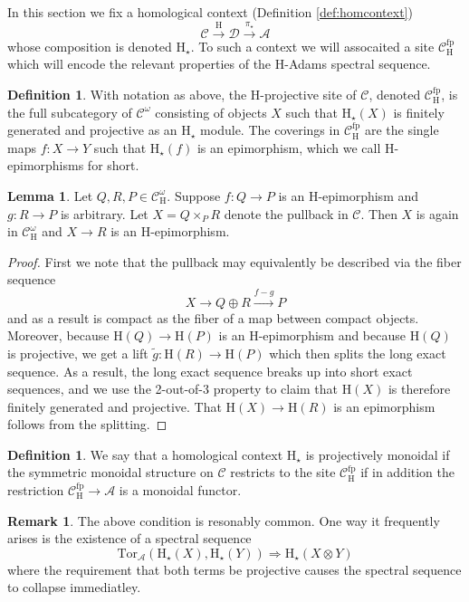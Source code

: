 \documentclass[10pt]{amsart}
\theoremstyle{definition}
\numberwithin{figure}{section}
\numberwithin{equation}{section}
\newtheorem{lemma}[figure]{Lemma}
\newtheorem{definition}[figure]{Definition}
\newtheorem{remark}[figure]{Remark}
\newcommand{\cA}{\mathcal{A}}
\newcommand{\cC}{\mathcal{C}}
\newcommand{\cD}{\mathcal{D}}
\theoremstyle{cited}
\newcommand{\fp}{\mathrm{fp}}
\renewcommand{\H}{\mathrm{H}}
\newcommand{\Tor}{\mathrm{Tor}}
\begin{document}
In this section we fix a homological context (Definition \ref{def:homcontext})
\[
\cC\xrightarrow{\H} \cD \xrightarrow{\pi_\star} \cA
\]
whose composition is denoted $\H_\star$. To such a context we will assocaited a site $\cC_{\H}^\fp$ which will encode the relevant properties of the $\H$-Adams spectral sequence.

\begin{definition}\label{def:projectivesite}
  With notation as above, the $\H$-projective site of $\cC$, denoted $\cC^{\fp}_{\H}$, is the full subcategory of $\cC^\omega$ consisting of objects $X$ such that $\H_{\star}(X)$ is finitely generated and projective as an $\H_\star$ module. The coverings in $\cC^\fp_{\H}$ are the single maps $f:X\to Y$ such that $\H_\star(f)$ is an epimorphism, which we call $\H$-epimorphisms for short.
\end{definition}

\begin{lemma}
  \label{lem:sitepullbacks}
  Let $Q,R,P\in \cC^\omega_\H$. Suppose $f:Q\to P$ is an $\H$-epimorphism and $g:R\to P$ is arbitrary. Let $X=Q\times_P R$ denote the pullback in $\cC$. Then $X$ is again in $\cC^\omega_\H$ and $X\to R$ is an $\H$-epimorphism.
\end{lemma}

\begin{proof}
  First we note that the pullback may equivalently be described via the fiber sequence
  \[
  X\to Q\oplus R \xrightarrow{f-g} P
  \]
  and as a result is compact as the fiber of a map between compact objects. Moreover, because $\H(Q)\to \H(P)$ is an $\H$-epimorphism and because $\H(Q)$ is projective, we get a lift $\tilde g:\H(R)\to \H(P)$ which then splits the long exact sequence. As a result, the long exact sequence breaks up into short exact sequences, and we use the 2-out-of-3 property to claim that $\H(X)$ is therefore finitely generated and projective. That $\H(X)\to \H(R)$ is an epimorphism follows from the splitting.
\end{proof}

\begin{definition}
  We say that a homological context $\H_\star$ is projectively monoidal if 
  the symmetric monoidal structure on $\cC$ restricts to the site $\cC^\fp_\H$ if in addition the restriction $\cC^\fp_\H\to \cA$ is a monoidal functor.
\end{definition}

\begin{remark}
  The above condition is resonably common. One way it frequently arises is the existence of a spectral sequence 
  \[
  \Tor_{\cA}(\H_\star(X),\H_\star(Y))\Rightarrow \H_\star(X\otimes Y)
  \]
  where the requirement that both terms be projective causes the spectral sequence to collapse immediatley.
\end{remark}
\end{document}
